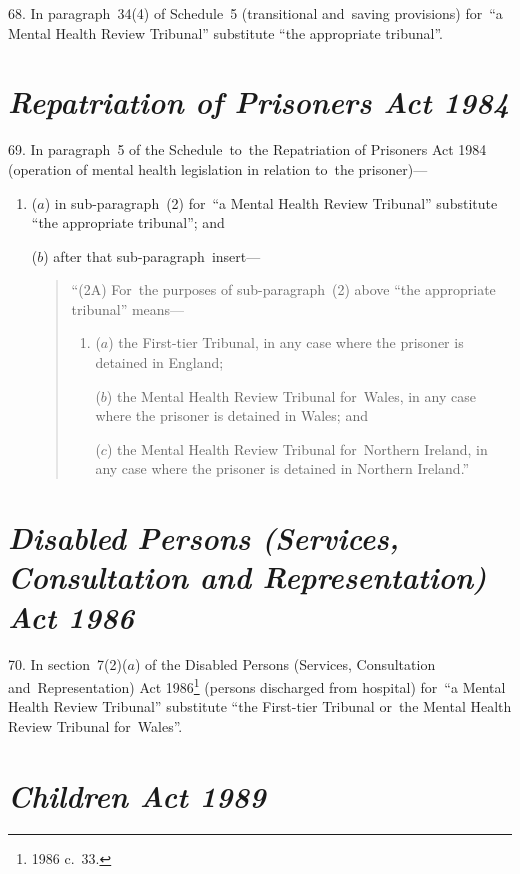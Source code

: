 \documentclass[12pt,a4paper]{article}
\begin{document}
\medskip

68.  In paragraph~34(4) of Schedule~5 (transitional and~saving provisions) for~“a Mental Health Review Tribunal” substitute “the appropriate tribunal”.

\section*{\itshape Repatriation of Prisoners Act 1984}

69.  In paragraph~5 of the Schedule~to~the Repatriation of Prisoners Act 1984 (operation of mental health legislation in relation to~the prisoner)—
\begin{enumerate}\item[]
($a$) in sub-paragraph~(2) for~“a Mental Health Review Tribunal” substitute “the appropriate tribunal”; and

($b$) after that sub-paragraph~insert—
\begin{quotation}
“(2A) For~the purposes of sub-paragraph~(2) above “the appropriate tribunal” means—
\begin{enumerate}\item[]
($a$) the First-tier Tribunal, in any case where the prisoner is detained in England;

($b$) the Mental Health Review Tribunal for~Wales, in any case where the prisoner is detained in Wales; and

($c$) the Mental Health Review Tribunal for~Northern Ireland, in any case where the prisoner is detained in Northern Ireland.”
\end{enumerate}
\end{quotation}
\end{enumerate}

\section*{\itshape\sloppy{} Disabled Persons (Services, Consultation and Representation) Act 1986}

70.  In section~7(2)($a$)  of the Disabled Persons (Services, Consultation and~Representation) Act 1986\footnote{1986 c.~33.} (persons discharged from hospital) for~“a Mental Health Review Tribunal” substitute “the First-tier Tribunal or~the Mental Health Review Tribunal for~Wales”.

\section*{\itshape Children Act 1989}
\end{document}
